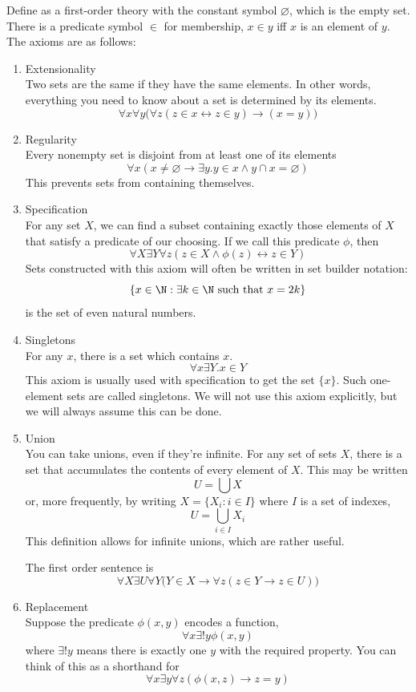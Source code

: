 \message{ !name(truth.tex)}\documentclass{scrbook}
\renewcommand{\implies}{\to}
\renewcommand{\iff}{\leftrightarrow}
\renewcommand{\emptyset}{\varnothing}
\begin{document}
Define \zfc as a first-order theory with the constant symbol $\emptyset$, which is the empty set. There is a predicate symbol $\in$ for membership, \ie $x\in y$ iff $x$ is an element of $y$. The axioms are as follows:
\begin{enumerate}
\item Extensionality \\
  Two sets are the same if they have the same elements. In other words, everything you need to know about a set is determined by its elements.
  \[
  \forall x \forall y  \bigl(\forall z(z\in x \iff z \in y)\implies (x=y)\bigr)
  \]
  \label{extensionality}
\item Regularity \\  
  Every nonempty set is disjoint from at least one of its elements
  \[
  \forall x (x\neq \emptyset \implies \exists y . y\in x \wedge y\cap x = \emptyset)
  \]
  This prevents sets from containing themselves. \label{zfc:reg} 
\item Specification\label{zfc:spec} \\ 
  For any set $X$, we can find a subset containing exactly those elements of $X$ that satisfy a predicate of our choosing. If we call this predicate $\phi$, then
  \[
  \forall X \exists Y \forall z  (z\in X \wedge \phi(z) \iff z\in Y)
  \]
  Sets constructed with this axiom will often be written in set builder notation:
  \[
  \{x\in \N: \exists k \in \N \textrm{ such that } x=2k\}
  \]
  is the set of even natural numbers.
\item Singletons \\ 
  For any $x$, there is a set which contains $x$. 
  \[
  \forall x \exists Y . x\in Y
  \]
  This axiom is usually used with specification to get the set $\{x\}$. Such one-element sets are called singletons. 
  We will not use this axiom explicitly, but we will always assume this can be done. 
\item Union \\
  You can take unions, even if they're infinite. 
  For any set of sets $X$, there is a set that accumulates the contents of every element of $X$. This may be written
  \[
  U=\bigcup X
  \]
  or, more frequently, by writing $X=\{X_i:i\in I\}$ where $I$ is a set of indexes,
  \[
  U=\bigcup_{i\in I} X_i
  \]
  This definition allows for infinite unions, which are rather useful. 
  
  The first order sentence is
  \[
  \forall X\exists U \forall Y \bigl(Y\in X \implies \forall z (z\in Y \implies z\in U)\bigr)
  \]
\item Replacement \\ 
  Suppose the predicate $\phi(x,y)$ encodes a function, \ie 
  \[
  \forall x \exists! y \phi(x,y)
  \]
  where $\exists!y$ means there is exactly one $y$ with the required property. You can think of this as a shorthand for
  \[
  \forall x \exists y \forall z (\phi(x,z)\implies z=y)
  \]
  

\end{enumerate}
\end{document}
